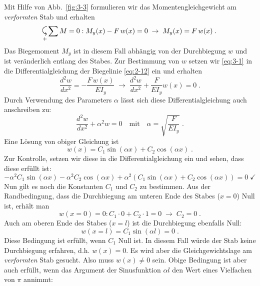 Mit Hilfe von Abb.~\ref{fig:3-3} formulieren wir das Momentengleichgewicht am \emph{verformten} Stab und erhalten
%
\begin{equation}
\pmr\sum M = 0: M_y(x) - F\,w(x) = 0 \;\rightarrow\; M_y(x) = F\,w(x) \; .
\label{eq:3-1}
\end{equation}
%
Das Biegemoment $M_y$ ist in diesem Fall abhängig von der Durchbiegung $w$ und ist veränderlich entlang des Stabes.
Zur Bestimmung von $w$ setzen wir \eqref{eq:3-1} in die Differentialgleichung der Biegelinie \eqref{eq:2-12} ein und erhalten
%
\begin{equation}
\dfrac{d^2w}{dx^2}=-\dfrac{F\,w(x)}{EI_y} \;\rightarrow\;\dfrac{d^2w}{dx^2}+\dfrac{F}{EI_y}w(x) = 0 \; .
\label{eq:3-2}
\end{equation}
%
Durch Verwendung des Parameters $\alpha$ lässt sich diese Differentialgleichung auch anschreiben zu:
%
\begin{equation}
\dfrac{d^2w}{dx^2} + \alpha^2 w = 0 \quad\text{mit}\quad\alpha=\sqrt{\dfrac{F}{EI_y}} \; .
\label{eq:3-3}
\end{equation}
%
Eine Lösung von obiger Gleichung ist
%
\begin{equation}
w(x) = C_1\sin(\alpha x) + C_2\cos(\alpha x) \; .
\label{eq:3-4}
\end{equation}
%
Zur Kontrolle, setzen wir diese in die Differentialgleichung ein und sehen, dass diese erfüllt ist:
%
\begin{equation}
-\alpha^2 C_1\sin(\alpha x) -\alpha^2  C_2\cos(\alpha x) + \alpha^2(C_1\sin(\alpha x) + C_2\cos(\alpha x)) = 0 \; \checkmark
\label{eq:3-5}
\end{equation}
%
Nun gilt es noch die Konstanten $C_1$ und $C_2$ zu bestimmen. Aus der Randbedingung, dass die Durchbiegung am unteren Ende des Stabes ($x=0$) Null ist, erhält man
%
\begin{equation}
w(x=0) = 0:C_1\cdot 0 + C_2\cdot 1 = 0 \;\rightarrow\; C_2 = 0 \; .
\label{eq:3-6}
\end{equation}
%
Auch am oberen Ende des Stabes ($x=l$) ist die Durchbiegung ebenfalls Null:
%
\begin{equation}
w(x=l) = C_1\sin(\alpha l) = 0 \; .
\label{eq:3-7}
\end{equation}
%
Diese Bedingung ist erfüllt, wenn $C_1$ Null ist.
In diesem Fall würde der Stab keine Durchbiegung erfahren, d.h. $w(x) = 0$.
Es wird aber die Gleichgewichtslage am \emph{verformten} Stab gesucht.
Also muss $w(x)\neq0$ sein. Obige Bedingung ist aber auch erfüllt, wenn das Argument der Sinusfunktion $\alpha l$ den Wert eines Vielfachen von $\pi$ annimmt: 
